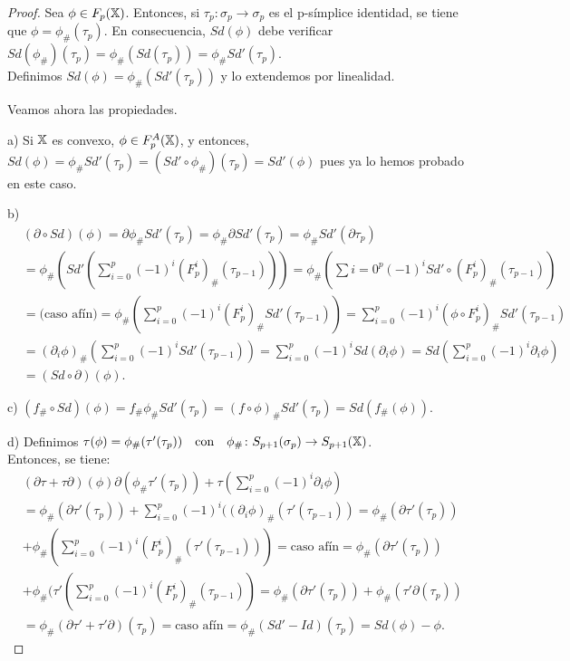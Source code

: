 \begin{proof}
  Sea $\phi \in F_p({\mathbb X})$. Entonces, si $\tau_p \colon \sigma_p \to \sigma_p$ es el p-símplice identidad, se tiene que
  $\phi = \phi_\#(\tau_p)$. En consecuencia, $Sd(\phi)$ debe verificar $Sd(\phi_\#)(\tau_p) = \phi_\#(Sd(\tau_p)) = \phi_\# Sd'(\tau_p)$. \\
  Definimos $Sd(\phi) = \phi_\#(Sd'(\tau_p))$ y lo extendemos por linealidad.

  Veamos ahora las propiedades.

  a) Si ${\mathbb X}$ es convexo, $\phi \in F_p^A({\mathbb X})$, y entonces, $Sd(\phi) = \phi_\# Sd'(\tau_p) = (Sd' \circ \phi_\#)(\tau_p) = Sd'(\phi)$
  pues ya lo hemos probado en este caso.

  b) \begin{align*}
    &(\partial \circ Sd)(\phi) = \partial \phi_\# Sd'(\tau_p) = \phi_\# \partial Sd'(\tau_p) = \phi_\# Sd'(\partial \tau_p) \\
    &= \phi_\#(Sd'(\sum\limits_{i = 0}^p (-1)^i (F_p^i)_\# (\tau_{p-1}))) = \phi_\#(\sum\limits{i = 0}^p (-1)^i Sd' \circ (F_p^i)_\#(\tau_{p-1}))\\
    &= \text{(caso afín)} = \phi_\#(\sum\limits_{i = 0}^p (-1)^i (F_p^i)_\# Sd'(\tau_{p-1})) = \sum\limits_{i = 0}^p (-1)^i (\phi \circ F_p^i)_\# Sd'(\tau_{p-1}) \\
    &= (\partial_i \phi)_\# (\sum\limits_{i = 0}^p (-1)^i Sd'(\tau_{p-1})) = \sum\limits_{i = 0}^p (-1)^i Sd(\partial_i \phi) = Sd(\sum\limits_{i = 0}^p (-1)^i \partial_i \phi) \\
    &= (Sd \circ \partial)(\phi).
  \end{align*}

  c) $(f_\# \circ Sd)(\phi) = f_\# \phi_\# Sd'(\tau_p) = (f \circ \phi)_\# Sd'(\tau_p) = Sd(f_\#(\phi))$.

  d) Definimos $\tau(\phi) = \phi_\#(\tau'(\tau_p)) \quad \text{con} \quad \phi_\# \colon S_{p+1}(\sigma_p) \to S_{p+1}({\mathbb X})$. \\
  Entonces, se tiene:
  \begin{align*}
    &(\partial \tau + \tau \partial)(\phi) \partial(\phi_\# \tau'(\tau_p)) + \tau(\sum\limits_{i = 0}^p (-1)^i \partial_i \phi) \\
    &= \phi_\#(\partial \tau'(\tau_p)) + \sum\limits_{i = 0}^p (-1)^i((\partial_i \phi)_\#(\tau'(\tau_{p-1})) = \phi_\#(\partial \tau'(\tau_p)) \\
    &+ \phi_\#(\sum\limits_{i = 0}^p (-1)^i (F_p^i)_\# (\tau'(\tau_{p-1}))) = \text{caso afín} = \phi_\#(\partial \tau'(\tau_p)) \\
    &+ \phi_\#(\tau'(\sum\limits_{i = 0}^p (-1)^i (F_p^i)_\#(\tau_{p-1})) = \phi_\#(\partial \tau'(\tau_p)) + \phi_\#(\tau'\partial(\tau_p)) \\
    &= \phi_\#(\partial \tau' + \tau' \partial)(\tau_p) = \text{caso afín} = \phi_\#(Sd' - Id)(\tau_p) = Sd(\phi) - \phi.
  \end{align*}


\end{proof}
